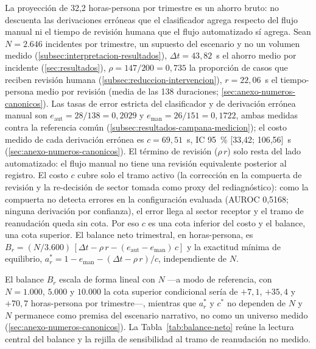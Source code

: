 La proyección de 32,2 horas-persona por trimestre es un ahorro bruto: no descuenta las derivaciones erróneas que el clasificador agrega respecto del flujo manual ni el tiempo de revisión humana que el flujo automatizado sí agrega. Sean \(N = 2.646\) incidentes por trimestre, un supuesto del escenario y no un volumen medido (\autoref{subsec:interpretacion-resultados}), \(\Delta t = 43{,}82\)~s el ahorro medio por incidente (\autoref{sec:resultados}), \(\rho = 147/200 = 0{,}735\) la proporción de casos que reciben revisión humana (\autoref{subsec:reduccion-intervencion}), \(r = 22{,}06\)~s el tiempo-persona medio por revisión (media de las 138 duraciones; \autoref{sec:anexo-numeros-canonicos}). Las tasas de error estricta del clasificador y de derivación errónea manual son \(e_{\mathrm{aut}} = 28/138 = 0{,}2029\) y \(e_{\mathrm{man}} = 26/151 = 0{,}1722\), ambas medidas contra la referencia común (\autoref{subsec:resultados-campana-medicion}); el costo medido de cada derivación errónea es \(c = 69{,}51\)~s, IC 95~\% [33,42; 106,56]~s (\autoref{sec:anexo-numeros-canonicos}). El término de revisión (\(\rho\,r\)) solo resta del lado automatizado: el flujo manual no tiene una revisión equivalente posterior al registro. El costo \(c\) cubre solo el tramo activo (la corrección en la compuerta de revisión y la re-decisión de sector tomada como proxy del rediagnóstico): como la compuerta no detecta errores en la configuración evaluada (AUROC 0,5168; ninguna derivación por confianza), el error llega al sector receptor y el tramo de reanudación queda sin cota. Por eso \(c\) es una cota inferior del costo y el balance, una cota superior. El balance neto trimestral, en horas-persona, es \(B_r = (N/3.600)\,[\Delta t - \rho\,r - (e_{\mathrm{aut}} - e_{\mathrm{man}})\,c]\) y la exactitud mínima de equilibrio, \(a^{*}_r = 1 - e_{\mathrm{man}} - (\Delta t - \rho\,r)/c\), independiente de \(N\).

El balance \(B_r\) escala de forma lineal con \(N\) ---a modo de referencia, con \(N = 1.000\), \(5.000\) y \(10.000\) la cota superior condicional sería de \(+7{,}1\), \(+35{,}4\) y \(+70{,}7\) horas-persona por trimestre---, mientras que \(a^{*}_r\) y \(c^{*}\) no dependen de \(N\) y \(N\) permanece como premisa del escenario narrativo, no como un universo medido (\autoref{sec:anexo-numeros-canonicos}). La Tabla~\ref{tab:balance-neto} reúne la lectura central del balance y la rejilla de sensibilidad al tramo de reanudación no medido.

